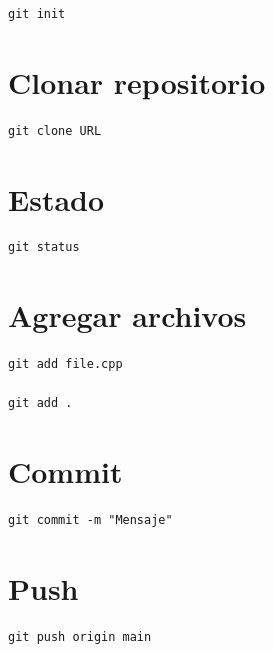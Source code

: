 \documentclass[a4paper,11pt]{article}
\begin{document}
\begin{lstlisting}
git init
\end{lstlisting}


\section*{Clonar repositorio}

\begin{lstlisting}
git clone URL
\end{lstlisting}


\section*{Estado}

\begin{lstlisting}
git status
\end{lstlisting}


\section*{Agregar archivos}

\begin{lstlisting}
git add file.cpp

git add .
\end{lstlisting}


\section*{Commit}

\begin{lstlisting}
git commit -m "Mensaje"
\end{lstlisting}


\section*{Push}

\begin{lstlisting}
git push origin main
\end{lstlisting}
\end{document}
